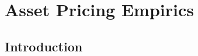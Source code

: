 




\def\bbR{{I\kern-0.3em R}}

\def\Az{{A_z}}
\def\Cz{{C_z}}
\def\ez{{e_z}}

\def\epigraph#1#2{%
\begingroup
\smallskip
\leftskip=2em
\rightskip=0pt plus2em
\it\noindent #1\par
\noindent --- #2\par
\endgroup\noindent}

\def\tone{{t+1}}
\def\toner{{t-1}}
\def\pdp{{{p_{t+1}+d_{t+1}\over p_t}}}
\def\ucuc{{{u'(c_{t+1})\over u'(c_t)}}}
\def\ucucc{{{u'(c_{t+2})\over u'(c_t)}}}
\def\cov{{\rm cov}}
\chapter{Asset Pricing Empirics\label{assetpricing2}}
\section{Introduction}

